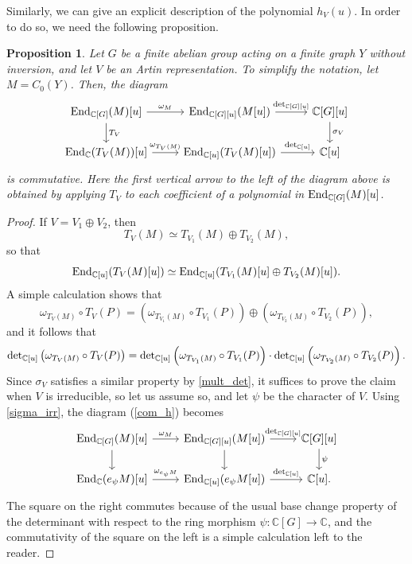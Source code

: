 \documentclass[11pt]{amsart}
\newtheorem{proposition}[theorem]{Proposition}
\numberwithin{equation}{section}
\theoremstyle{remark}
\theoremstyle{definition}
\begin{document}
Similarly, we can give an explicit description of the polynomial $h_{V}(u)$.  In order to do so, we need the following proposition.
\begin{proposition} \label{useful_c_d}
Let $G$ be a finite abelian group acting on a finite graph $Y$ without inversion, and let $V$ be an Artin representation.  To simplify the notation, let $M=C_{0}(Y)$.  Then, the diagram
\begin{equation} \label{com_h}
\begin{tikzcd}
 {\rm End}_{\mathbb{C}[G]}(M)[u] \arrow["T_{V}",d] \arrow["\omega_{M}",r] & {\rm End}_{\mathbb{C}[G][u]}(M[u])  \arrow["{\rm det}_{\mathbb{C}[G][u]}",r] & \mathbb{C}[G][u]  \arrow["\sigma_{V}",d] \\
 {\rm End}_{\mathbb{C}}(T_{V}(M))[u] \arrow["\omega_{T_{V}(M)}",r] & {\rm End}_{\mathbb{C}[u]}(T_{V}(M)[u]) \arrow["{\rm det}_{\mathbb{C}[u]}",r]&   \mathbb{C}[u]
\end{tikzcd}
\end{equation}
is commutative.  Here the first vertical arrow to the left of the diagram above is obtained by applying $T_{V}$ to each coefficient of a polynomial in ${\rm End}_{\mathbb{C}[G]}(M)[u]$.
\end{proposition}
\begin{proof}
If $V  = V_{1} \oplus V_{2}$, then
$$T_{V}(M) \simeq T_{V_{1}}(M) \oplus T_{V_{2}}(M), $$
so that
$${\rm End}_{\mathbb{C}[u]}(T_{V}(M)[u]) \simeq {\rm End}_{\mathbb{C}[u]}(T_{V_{1}}(M)[u] \oplus T_{V_{2}}(M)[u]). $$
A simple calculation shows that
\begin{equation*}
\omega_{T_{V}(M)} \circ T_{V}(P) = \left(\omega_{T_{V_{1}}(M)} \circ T_{V_{1}}(P)\right) \oplus \left(\omega_{T_{V_{2}}(M)} \circ T_{V_{2}}(P) \right),
\end{equation*} 
and it follows that
$${\rm det}_{\mathbb{C}[u]}\left(\omega_{T_{V}(M)} \circ T_{V}(P) \right) = {\rm det}_{\mathbb{C}[u]}\left(\omega_{T_{V_{1}}(M)} \circ T_{V_{1}}(P) \right) \cdot {\rm det}_{\mathbb{C}[u]}\left(\omega_{T_{V_{2}}(M)} \circ T_{V_{2}}(P) \right). $$
Since $\sigma_{V}$ satisfies a similar property by \cref{mult_det}, it suffices to prove the claim when $V$ is irreducible, so let us assume so, and let $\psi$ be the character of $V$.  Using \cref{sigma_irr}, the diagram (\ref{com_h}) becomes
\begin{equation*}
\begin{tikzcd}
 {\rm End}_{\mathbb{C}[G]}(M)[u] \arrow[d] \arrow["\omega_{M}",r] & {\rm End}_{\mathbb{C}[G][u]}(M[u]) \arrow[d] \arrow["{\rm det}_{\mathbb{C}[G][u]}",r] & \mathbb{C}[G][u]  \arrow["\psi",d] \\
 {\rm End}_{\mathbb{C}}(e_{\psi}M)[u] \arrow["\omega_{e_{\psi}M}",r] & {\rm End}_{\mathbb{C}[u]}(e_{\psi}M[u]) \arrow["{\rm det}_{\mathbb{C}[u]}",r]&   \mathbb{C}[u].
\end{tikzcd}
\end{equation*}
The square on the right commutes because of the usual base change property of the determinant with respect to the ring morphism $\psi:\mathbb{C}[G] \rightarrow \mathbb{C}$, and the commutativity of the square on the left is a simple calculation left to the reader.
\end{proof}
\end{document}
